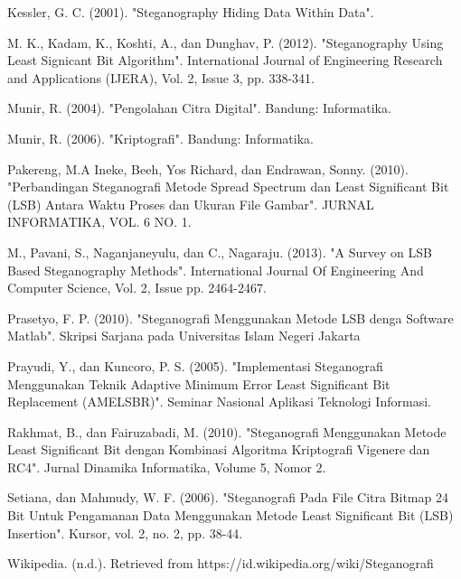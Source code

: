 \documentclass{jtetiskripsi}
\begin{document}
\begin{thebibliography}{99}
	Kessler, G. C. (2001). "Steganography Hiding Data Within Data".
	
	M. K., Kadam, K., Koshti, A., dan Dunghav, P. (2012). "Steganography Using Least Signicant Bit Algorithm". International Journal of Engineering Research and Applications (IJERA), Vol. 2, Issue 3, pp. 338-341.
	
	Munir, R. (2004). "Pengolahan Citra Digital". Bandung: Informatika.
	
	Munir, R. (2006). "Kriptografi". Bandung: Informatika.
	
	Pakereng, M.A Ineke, Beeh, Yos Richard, dan Endrawan, Sonny. (2010). "Perbandingan Steganografi Metode Spread Spectrum dan Least Significant Bit (LSB) Antara Waktu Proses dan Ukuran File Gambar". JURNAL INFORMATIKA, VOL. 6 NO. 1.
	
	M., Pavani, S., Naganjaneyulu, dan C., Nagaraju. (2013). "A Survey on LSB Based Steganography Methods". International Journal Of Engineering And Computer Science, Vol. 2, Issue pp. 2464-2467.
	
	Prasetyo, F. P. (2010). "Steganografi Menggunakan Metode LSB denga Software Matlab". Skripsi Sarjana pada Universitas Islam Negeri Jakarta
	
	Prayudi, Y., dan Kuncoro, P. S. (2005). "Implementasi Steganografi Menggunakan Teknik Adaptive Minimum Error Least Significant Bit Replacement (AMELSBR)". Seminar Nasional Aplikasi Teknologi Informasi.
	
	Rakhmat, B., dan Fairuzabadi, M. (2010). "Steganografi Menggunakan Metode Least Significant Bit dengan Kombinasi Algoritma Kriptografi Vigenere dan RC4". Jurnal Dinamika Informatika, Volume 5, Nomor 2.
	
	Setiana, dan Mahmudy, W. F. (2006). "Steganografi Pada File Citra Bitmap 24 Bit Untuk Pengamanan Data Menggunakan Metode Least Significant Bit (LSB) Insertion". Kursor, vol. 2, no. 2, pp. 38-44.
	
	Wikipedia. (n.d.). Retrieved from https://id.wikipedia.org/wiki/Steganografi
		
		
	
\end{thebibliography}

%

%
\end{document}
